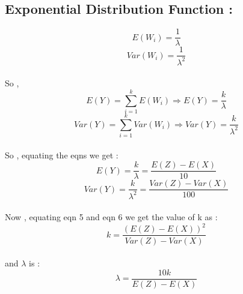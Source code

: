 \documentclass{article}
\begin{document}
    \subsection{Exponential Distribution Function :}
    \vspace{5pt}
    \setcounter{equation}{0}
    \begin{equation}
        E(W_i) = \frac{1}{\lambda} 
    \end{equation}
    \begin{equation}
        Var(W_i) = \frac{1}{\lambda^2}
    \end{equation}
    \\So ,
    \begin{equation}
        E(Y) = \sum_{i = 1}^{k} E(W_i)
        \Rightarrow E(Y) = \frac{k}{\lambda}
    \end{equation}
    \begin{equation}
        Var(Y) = \sum_{i = 1}^{k} Var(W_i)
        \Rightarrow Var(Y) = \frac{k}{\lambda^2}
    \end{equation}
    \vspace{5pt}
    \\So , equating the eqns we get : 
    \begin{equation}
        E(Y) = \frac{k}{\lambda}  = \frac{E(Z) - E(X)}{10}
    \end{equation}
    \begin{equation}
        Var(Y) = \frac{k}{\lambda^2} = \frac{Var(Z) - Var(X)}{100}
    \end{equation}
    \vspace{5pt}
    \\Now , equating eqn 5 and eqn 6 we get the value of k as : 
    \begin{equation}
        k = \frac{(E(Z) - E(X))^2}{Var(Z) - Var(X)}
    \end{equation}
    \vspace{5pt}
    \\ and $\lambda$ is :
    \begin{equation}
        \lambda = \frac{10k}{E(Z) - E(X)}
    \end{equation}
\end{document}

